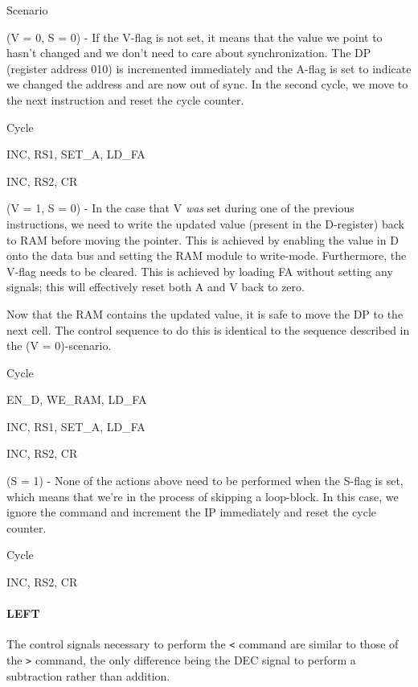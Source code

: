\begin{labeledenum}{Scenario}
\item (V = 0, S = 0) - If the V-flag is not set, it means that the value we point to hasn't changed and we don't need to care about synchronization. The DP (register address 010) is incremented immediately and the A-flag is set to indicate we changed the address and are now out of sync. In the second cycle, we move to the next instruction and reset the cycle counter.

  \begin{labeledenum}{Cycle}
  \item INC, RS1, SET\_A, LD\_FA
  \item INC, RS2, CR
  \end{labeledenum}
  
\item (V = 1, S = 0) - In the case that V \emph{was} set during one of the previous instructions, we need to write the updated value (present in the D-register) back to RAM before moving the pointer. This is achieved by enabling the value in D onto the data bus and setting the RAM module to write-mode. Furthermore, the V-flag needs to be cleared. This is achieved by loading FA without setting any signals; this will effectively reset both A and V back to zero.

  Now that the RAM contains the updated value, it is safe to move the DP to the next cell. The control sequence to do this is identical to the sequence described in the (V = 0)-scenario.

  \begin{labeledenum}{Cycle}
  \item EN\_D, WE\_RAM, LD\_FA
  \item INC, RS1, SET\_A, LD\_FA
  \item INC, RS2, CR
  \end{labeledenum}
  
\item (S = 1) - None of the actions above need to be performed when the S-flag is set, which means that we're in the process of skipping a loop-block. In this case, we ignore the command and increment the IP immediately and reset the cycle counter.
  \begin{labeledenum}{Cycle}
  \item INC, RS2, CR
  \end{labeledenum}

\end{labeledenum}

\paragraph{LEFT} The control signals necessary to perform the \texttt{<} command are similar to those of the \texttt{>} command, the only difference being the DEC signal to perform a subtraction rather than addition.


